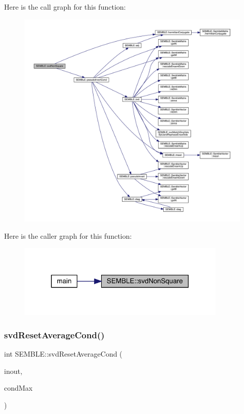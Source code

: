 Here is the call graph for this function\+:
\nopagebreak
\begin{figure}[H]
\begin{center}
\leavevmode
\includegraphics[width=350pt]{d7/dfd/namespaceSEMBLE_a866079e585b77c937ef4241e6c2f72be_cgraph}
\end{center}
\end{figure}
Here is the caller graph for this function\+:
\nopagebreak
\begin{figure}[H]
\begin{center}
\leavevmode
\includegraphics[width=282pt]{d7/dfd/namespaceSEMBLE_a866079e585b77c937ef4241e6c2f72be_icgraph}
\end{center}
\end{figure}
\mbox{\label{namespaceSEMBLE_a63cc1ba6c9e1c57e90030d6128a4642a}} 
\subsubsection{\texorpdfstring{svdResetAverageCond()}{svdResetAverageCond()}}
{\footnotesize\ttfamily int S\+E\+M\+B\+L\+E\+::svd\+Reset\+Average\+Cond (\begin{DoxyParamCaption}\item[{const \mbox{\hyperlink{structSEMBLE_1_1SembleVector}{Semble\+Vector}}$<$ double $>$ \&}]{inout,  }\item[{const double}]{cond\+Max }\end{DoxyParamCaption})}

